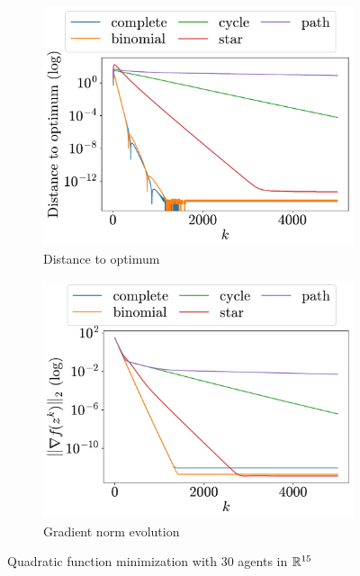 \documentclass[a4paper,11pt,oneside]{book}
\begin{document}
\begin{figure}[H]
      \centering
      \begin{subfigure}[t]{0.48\linewidth}
            \centering
            \includegraphics[width=\linewidth]{./figs/quadratic/30_15/distance.pdf} 
            \caption{Distance to optimum}
      \end{subfigure}
      \hfill
      \begin{subfigure}[t]{0.48\linewidth}
            \centering
            \includegraphics[width=\linewidth]{./figs/quadratic/30_15/gradient.pdf} 
            \caption{Gradient norm evolution}
      \end{subfigure}
      \caption{Quadratic function minimization with $30$ agents in ${\mathbb{R}}^{15}$}
      \label{fig:quadratic_30_15}
\end{figure}
\end{document}
